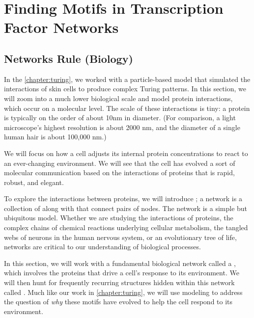 \chapter[Finding Motifs in Transcription Factor Networks]{Finding Motifs in Transcription Factor Networks}
\label{chapter:motifs}
\renewcommand{\chaptertitle}{Finding Motifs in Transcription Factor Networks}


\FloatBarrier

\section{Networks Rule (Biology)}
\label{sec:introduction}

In the \autoref{chapter:turing}, we worked with a particle-based model that simulated the interactions of skin cells to produce complex Turing patterns. In this section, we will zoom into a much lower biological scale and model protein interactions, which occur on a molecular level. The scale of these interactions is tiny: a protein is typically on the order of about 10nm in diameter. (For comparison, a light microscope's highest resolution is about 2000 nm, and the diameter of a single human hair is about 100,000 nm.)

We will focus on how a cell adjusts its internal protein concentrations to react to an ever-changing environment.  We will see that the cell has evolved a sort of molecular communication based on the interactions of proteins that is rapid, robust, and elegant.

To explore the interactions between proteins, we will introduce ; a network is a collection of  along with  that connect pairs of nodes. The network is a simple but ubiquitous model. Whether we are studying the interactions of proteins, the complex chains of chemical reactions underlying cellular metabolism, the tangled webs of neurons in the human nervous system, or an evolutionary tree of life, networks are critical to our understanding of biological processes.

In this section, we will work with a fundamental biological network called a , which involves the proteins that drive a cell's response to its environment. We will then hunt for frequently recurring structures hidden within this network called . Much like our work in \autoref{chapter:turing}, we will use modeling to address the question of \textit{why} these motifs have evolved to help the cell respond to its environment.

